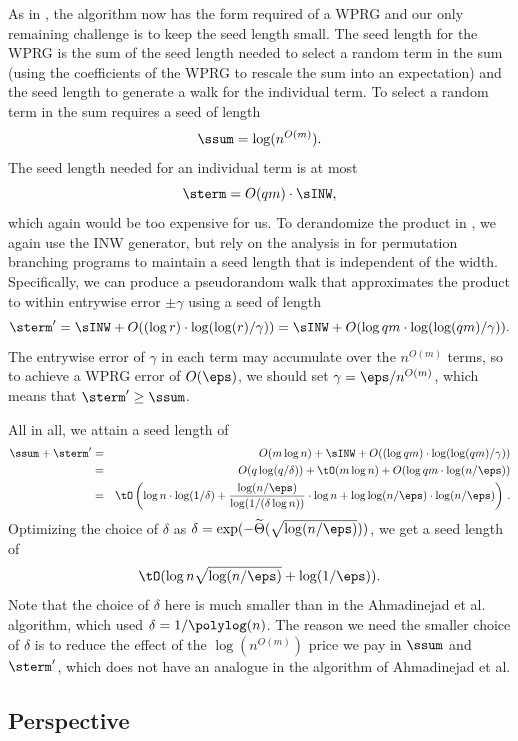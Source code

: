 \documentclass{toc}
\begin{document}
    As in , the algorithm now has the form required of a WPRG and our only remaining challenge is to keep the seed length small. 
    The seed length
    for the WPRG is the sum of the seed length needed to select a random term in the sum (using the coefficients of the WPRG to rescale the sum into an expectation) and the seed length to generate a walk for the individual term.
    To select a random term in the sum requires a seed of length
    $$\ssum = \log (n^{O(m)}).$$
    The seed length needed for an individual term is at most $$\sterm = O(qm)\cdot \sINW,$$
    which again would be too expensive for us.
    To derandomize the product in , 
    we again use the INW generator, but
    rely on the analysis in \cite{HozaPyVa21} for permutation branching
    programs to maintain a seed length that is independent of the width.  Specifically, we can produce a pseudorandom walk that approximates the product to within entrywise error $\pm \gamma$ using a seed of length 
    $$\sterm' = \sINW+O((\log r)\cdot \log(\log(r)/\gamma))
    = \sINW + O(\log qm\cdot \log(\log(qm)/\gamma)).$$
    The entrywise error of $\gamma$ in each term may accumulate over the $n^{O(m)}$ terms, so to achieve a WPRG error of $O(\eps)$, we should set $\gamma=\eps/n^{O(m)}$, which means that $\sterm' \geq \ssum$.  
    
    All in all, we attain a seed length of
    \begin{eqnarray*}
    \ssum+\sterm' 
    &=& O(m\log n)+\sINW+O((\log qm)\cdot \log(\log(qm)/\gamma))\\
    &=& O(q\log(q/\delta)) + \tO(m\log n) + O(\log qm\cdot \log(n/\eps))\\
    &=& \tO\left(\log n\cdot \log(1/\delta) + \frac{\log(n/\eps)}{\log(1/(\delta\log n))}\cdot \log n + \log\log(n/\eps)\cdot \log(n/\eps)\right)\,.
    \end{eqnarray*}
    Optimizing the choice of $\delta$ as $\delta = \exp(-\widetilde{\Theta}(\sqrt{\log(n/\eps)}))$, we get a seed length of
    $$\tO(\log n\sqrt{\log(n/\eps)} + \log(1/\eps)).$$
    Note that the choice of $\delta$ here is much smaller than in 
    the %
Ahmadinejad  %
et al. algorithm, which used $\delta=1/\polylog(n)$.
    The reason we need the smaller choice of $\delta$ is to reduce the effect of the $\log(n^{O(m)})$ price we pay in $\ssum$ and $\sterm'$, which does not have an analogue in the algorithm of
%
Ahmadinejad  %
et al.
    
\subsection{Perspective}
\end{document}

